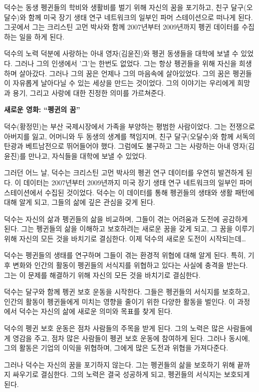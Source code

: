 \documentclass[
  letterpaper,
]{book}
\begin{document}
\begin{tcolorbox}
덕수는 동생 펭귄들의 학비와 생활비를 벌기 위해 자신의 꿈을 포기하고,
친구 달구(오달수)와 함께 미국 장기 생태 연구 네트워크의 일부인 파머
스테이션으로 떠나게 된다. 그곳에서 그는 크리스틴 고먼 박사와 함께
2007년부터 2009년까지 펭귄 데이터를 수집하는 일을 하게 된다.

덕수의 노력 덕분에 사랑하는 아내 영자(김윤진)와 펭귄 동생들을 대학에
보낼 수 있었다. 그러나 그의 인생에서 '그'는 한번도 없었다. 그는 항상
펭귄들을 위해 자신을 희생하며 살아갔다. 그러나 그의 꿈은 언제나 그의
마음속에 살아있었다. 그의 꿈은 펭귄들이 자유롭게 날아다닐 수 있는 세상을
만드는 것이었다. 그의 이야기는 우리에게 희망과 용기, 그리고 사랑에 대한
진정한 의미를 가르쳐준다.

\textbf{새로운 영화: ``펭귄의 꿈''}

덕수(황정민)는 부산 국제시장에서 가족을 부양하는 평범한 사람이었다. 그는
전쟁으로 아버지를 잃고, 어머니와 두 동생의 생계를 책임지며, 친구
달구(오달수)와 함께 서독의 탄광과 베트남전으로 뛰어들어야 했다. 그럼에도
불구하고 그는 사랑하는 아내 영자(김윤진)를 만나고, 자식들을 대학에 보낼
수 있었다.

그러던 어느 날, 덕수는 크리스틴 고먼 박사의 펭귄 연구 데이터를 우연히
발견하게 된다. 이 데이터는 2007년부터 2009년까지 미국 장기 생태 연구
네트워크의 일부인 파머 스테이션에서 수집된 것이었다. 덕수는 이 데이터를
통해 펭귄들의 생태와 생활 패턴에 대해 알게 되고, 그들의 삶에 깊은 관심을
갖게 된다.

덕수는 자신의 삶과 펭귄들의 삶을 비교하며, 그들이 겪는 어려움과 도전에
공감하게 된다. 그는 펭귄들의 삶을 이해하고 보호하려는 새로운 꿈을 갖게
되고, 그 꿈을 이루기 위해 자신의 모든 것을 바치기로 결심한다. 이제
덕수의 새로운 도전이 시작되는데\ldots{}

덕수는 펭귄들의 생태를 연구하며 그들이 겪는 환경적 위협에 대해 알게
된다. 특히, 기후 변화와 인간의 활동이 펭귄들의 서식지를 위협하고 있다는
사실에 충격을 받는다. 그는 이 문제를 해결하기 위해 자신의 모든 것을
바치기로 결심한다.

덕수는 달구와 함께 펭귄 보호 운동을 시작한다. 그들은 펭귄들의 서식지를
보호하고, 인간의 활동이 펭귄들에게 미치는 영향을 줄이기 위한 다양한
활동을 벌인다. 이 과정에서 덕수는 자신의 삶에 새로운 의미와 목표를 찾게
된다.

덕수의 펭귄 보호 운동은 점차 사람들의 주목을 받게 된다. 그의 노력은 많은
사람들에게 영감을 주고, 점차 많은 사람들이 펭귄 보호 운동에 참여하게
된다. 그러나 동시에, 그의 활동은 기업의 이익을 위협하며, 그에게 많은
도전과 위협을 가져다준다.

그러나 덕수는 자신의 꿈을 포기하지 않는다. 그는 펭귄들의 삶을 보호하기
위해 끝까지 싸우기로 결심한다. 그의 노력은 결국 성공하게 되고, 펭귄들의
서식지는 보호되게 된다.


\end{tcolorbox}
\end{document}
